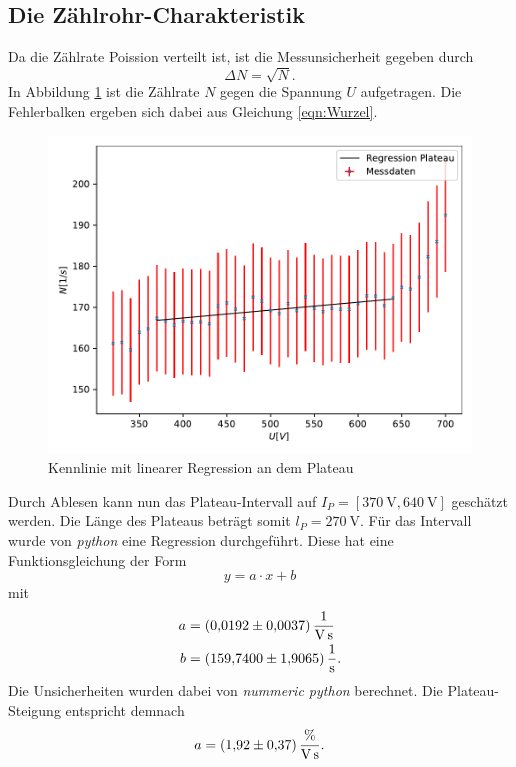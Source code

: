 \subsection{Die Zählrohr-Charakteristik}
\label{subsec:Charakteristik}
Da die Zählrate Poission verteilt ist, ist die Messunsicherheit gegeben durch
\begin{equation}
    \Delta N=\sqrt{N}. \label{eqn:Wurzel}
\end{equation}
In Abbildung \ref{fig:Kennlinie} ist die Zählrate $N$ gegen die Spannung $U$ aufgetragen. Die Fehlerbalken
ergeben sich dabei aus Gleichung \ref{eqn:Wurzel}.
\begin{figure}[H]
    \centering
    \includegraphics[scale=0.8]{auswertung/plot1.pdf}
    \caption{Kennlinie mit linearer Regression an dem Plateau}
    \label{fig:Kennlinie}
  \end{figure}
  \noindent Durch Ablesen kann nun das Plateau-Intervall auf $I_{P}=[\SI{370}{\volt}, \SI{640}{\volt}]$ geschätzt werden.
  Die Länge des Plateaus beträgt somit $l_{P}=\SI{270}{\volt}$. Für das Intervall
  wurde von \textit{python} eine Regression durchgeführt. Diese hat eine Funktionsgleichung der Form
  \begin{equation}
      y=a\cdot x+b \label{eqn:gerade}
  \end{equation}
  mit
  \begin{align*}
    a &= \SI{0.0192 \pm 0.0037}{\per\volt\per\second}\\
    b &= \SI{159.74 \pm 1.9065}{\per\second}.
  \end{align*}
  Die Unsicherheiten wurden dabei von  \textit{nummeric python} berechnet.
  Die Plateau-Steigung entspricht demnach
  \begin{equation*}
    a = \SI{1.92 \pm 0.37}{\percent\per\volt\per\second}.
  \end{equation*}

